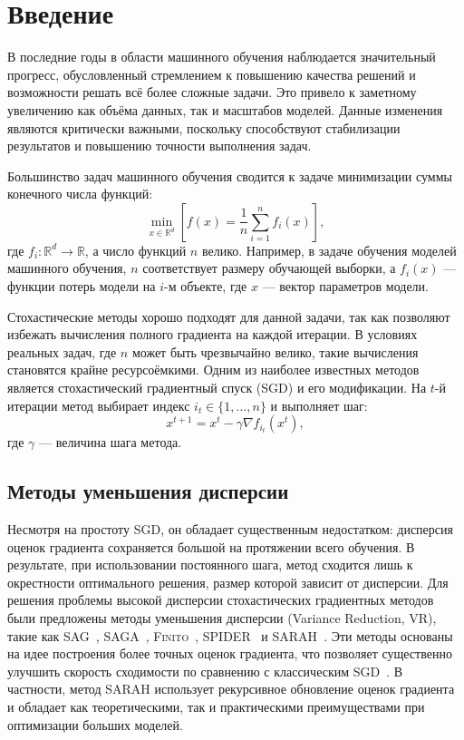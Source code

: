 \section{Введение}

В последние годы в области машинного обучения наблюдается значительный прогресс, обусловленный стремлением к повышению качества решений и возможности решать всё более сложные задачи. Это привело к заметному увеличению как объёма данных, так и масштабов моделей. Данные изменения являются критически важными, поскольку способствуют стабилизации результатов и повышению точности выполнения задач.

Большинство задач машинного обучения сводится к задаче минимизации суммы конечного числа функций:
\[
\underset{x\in\mathbb R^d}{\min}\left[f(x) = \frac{1}{n}\sum\limits_{i=1}^n f_i(x)\right],
\]
где \(f_i: \mathbb R^d \rightarrow \mathbb R\), а число функций \(n\) велико. Например, в задаче обучения моделей машинного обучения, \(n\) соответствует размеру обучающей выборки, а \(f_i(x)\) — функции потерь модели на \(i\)-м объекте, где \(x\) — вектор параметров модели.

Стохастические методы хорошо подходят для данной задачи, так как позволяют избежать вычисления полного градиента на каждой итерации. В условиях реальных задач, где \(n\) может быть чрезвычайно велико, такие вычисления становятся крайне ресурсоёмкими. Одним из наиболее известных методов является стохастический градиентный спуск (\textsc{SGD}) и его модификации. На \(t\)-й итерации метод выбирает индекс \(i_t\in\{1,\ldots,n\}\) и выполняет шаг:
\[
x^{t+1} = x^t - \gamma \nabla f_{i_t}(x^t),
\]
где \(\gamma\) — величина шага метода.

\subsection*{Методы уменьшения дисперсии}

Несмотря на простоту \textsc{SGD}, он обладает существенным недостатком: дисперсия оценок градиента сохраняется большой на протяжении всего обучения. В результате, при использовании постоянного шага, метод сходится лишь к окрестности оптимального решения, размер которой зависит от дисперсии. Для решения проблемы высокой дисперсии стохастических градиентных методов были предложены методы уменьшения дисперсии (Variance Reduction, VR), такие как \textsc{SAG}~\cite{schmidt2017minimizing}, \textsc{SAGA}~\cite{defazio2014saga}, \textsc{Finito}~\cite{defazio2014finito}, \textsc{SPIDER}~\cite{fang2018spider} и \textsc{SARAH}~\cite{nguyen2017sarah}. Эти методы основаны на идее построения более точных оценок градиента, что позволяет существенно улучшить скорость сходимости по сравнению с классическим \textsc{SGD}~\cite{robbins1951stochastic}. В частности, метод \textsc{SARAH} использует рекурсивное обновление оценок градиента и обладает как теоретическими, так и практическими преимуществами при оптимизации больших моделей.

